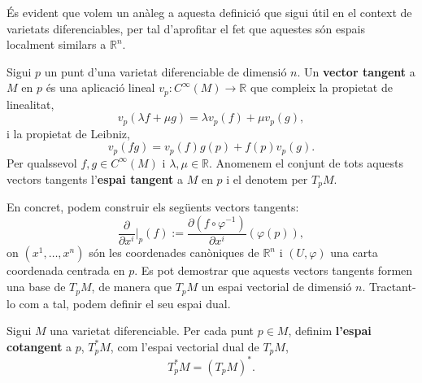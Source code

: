 És evident que volem un anàleg a aquesta definició que sigui útil en el context de varietats diferenciables, per tal d'aprofitar el fet que aquestes són espais localment similars a $\mathbb R^n$. 

\begin{defi}
    Sigui $p$ un punt d'una varietat diferenciable de dimensió $n$. Un \textbf{vector tangent} a $M$ en $p$ és una aplicació lineal $v_p:C^\infty(M)\to\mathbb R$ que compleix la propietat de linealitat,
    \begin{equation*}
        v_p(\lambda f+\mu g) = \lambda v_p(f) + \mu v_p(g), 
    \end{equation*}
    i la propietat de Leibniz,
    \begin{equation*}
        v_p(fg) = v_p(f)g(p) + f(p)v_p(g).
    \end{equation*}
    Per qualssevol $f,g\in C^\infty(M)$ i $\lambda,\mu\in\mathbb R$.
    Anomenem el conjunt de tots aquests vectors tangents l'\textbf{espai tangent} a $M$ en $p$ i el denotem per $T_pM$.
\end{defi}

En concret, podem construir els següents vectors tangents:
\begin{equation*}
    \frac{\partial}{\partial x^i}\Big|_p(f) := \frac{\partial(f\circ\varphi^{-1})}{\partial x^i}(\varphi(p)),
\end{equation*}
on $(x^1,\dots,x^n)$ són les coordenades canòniques de $\mathbb R^n$ i $(U,\varphi)$ una carta coordenada centrada en $p$. Es pot demostrar que aquests vectors tangents formen una base de $T_pM$, de manera que $T_pM$ un espai vectorial de dimensió $n$. Tractant-lo com a tal, podem definir el seu espai dual.

\begin{defi}
    Sigui $M$ una varietat diferenciable. Per cada punt $p\in M$, definim \textbf{l'espai cotangent} a $p$, $T^*_pM$, com l'espai vectorial dual de $T_pM$,
    \begin{equation*}
        T^*_pM = (T_pM)^*.
    \end{equation*}
\end{defi}






